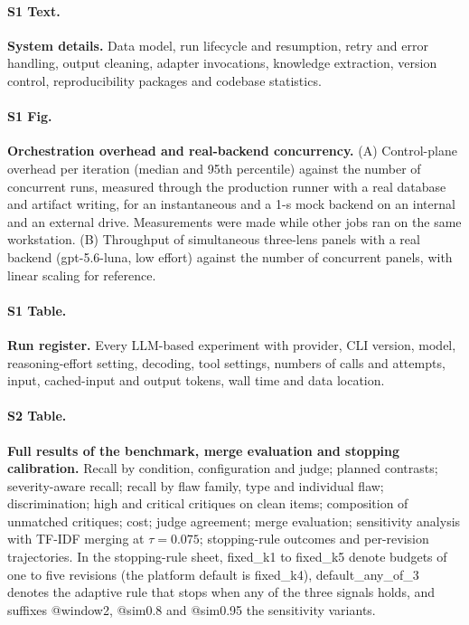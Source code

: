 \paragraph*{S1 Text.}
\label{S1_Text}
{\bf System details.} Data model, run lifecycle and resumption, retry and error handling, output cleaning, adapter invocations, knowledge extraction, version control, reproducibility packages and codebase statistics.

\paragraph*{S1 Fig.}
\label{S1_Fig}
{\bf Orchestration overhead and real-backend concurrency.} (A) Control-plane overhead per iteration (median and 95th percentile) against the number of concurrent runs, measured through the production runner with a real database and artifact writing, for an instantaneous and a 1-s mock backend on an internal and an external drive. Measurements were made while other jobs ran on the same workstation. (B) Throughput of simultaneous three-lens panels with a real backend (gpt-5.6-luna, low effort) against the number of concurrent panels, with linear scaling for reference.

\paragraph*{S1 Table.}
\label{S1_Table}
{\bf Run register.} Every LLM-based experiment with provider, CLI version, model, reasoning-effort setting, decoding, tool settings, numbers of calls and attempts, input, cached-input and output tokens, wall time and data location.

\paragraph*{S2 Table.}
\label{S2_Table}
{\bf Full results of the benchmark, merge evaluation and stopping calibration.} Recall by condition, configuration and judge; planned contrasts; severity-aware recall; recall by flaw family, type and individual flaw; discrimination; high and critical critiques on clean items; composition of unmatched critiques; cost; judge agreement; merge evaluation; sensitivity analysis with TF-IDF merging at $\tau=0.075$; stopping-rule outcomes and per-revision trajectories. In the stopping-rule sheet, fixed\_k1 to fixed\_k5 denote budgets of one to five revisions (the platform default is fixed\_k4), default\_any\_of\_3 denotes the adaptive rule that stops when any of the three signals holds, and suffixes @window2, @sim0.8 and @sim0.95 the sensitivity variants.

